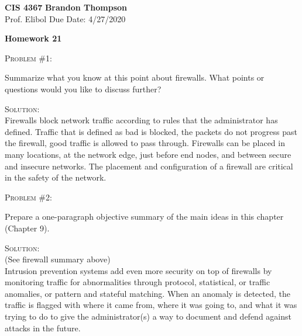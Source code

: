\documentclass[12pt]{article}
\newenvironment{problem}[1]
{\begin{mdframed}[linewidth=0.8pt]
        \textsc{Problem #1:}

}
    {\end{mdframed}}
\newenvironment{solution}
    {\textsc{Solution:}\\}
    {\newpage}%
\begin{document}
\noindent
\textbf{CIS 4367} \hfill \textbf{Brandon Thompson} \\
\normalsize Prof. Elibol \hfill Due Date: 4/27/2020 \\

\begin{center}
\textbf{Homework 21}
\end{center}
	\begin{problem}{\#1}
		Summarize what you know at this point about firewalls. What points or questions would you like to discuss further?
	\end{problem}
	\begin{solution}
		Firewalls block network traffic according to rules that the administrator has defined. Traffic that is defined as bad is blocked, the packets do not progress past the firewall, good traffic is allowed to pass through. Firewalls can be placed in many locations, at the network edge, just before end nodes, and between secure and insecure networks. The placement and configuration of a firewall are critical in the safety of the network.
	\end{solution}

	\begin{problem}{\#2}
		Prepare a one-paragraph objective summary of the main ideas in this chapter (Chapter 9).
	\end{problem}
	\begin{solution}
		(See firewall summary above)\\
		Intrusion prevention systems add even more security on top of firewalls by monitoring traffic for abnormalities through protocol, statistical, or traffic anomalies, or pattern and stateful matching. When an anomaly is detected, the traffic is flagged with where it came from, where it was going to, and what it was trying to do to give the administrator(s) a way to document and defend against attacks in the future. 
	\end{solution}
\end{document}
